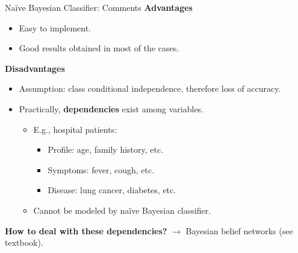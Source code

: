 \begin{frame}{Naïve Bayesian Classifier: Comments}
  \textbf{Advantages}
  \begin{itemize}
  \item Easy to implement.
  \item Good results obtained in most of the cases.
  \end{itemize}

  \textbf{Disadvantages}
  \begin{itemize}
  \item Assumption: class conditional independence, therefore loss of accuracy.
  \item Practically, \textbf{dependencies} exist among variables.
    \begin{itemize}
    \item E.g., hospital patients:
      \begin{itemize}
      \item Profile: age, family history, etc.
      \item Symptoms: fever, cough, etc.
      \item Disease: lung cancer, diabetes, etc.
      \end{itemize}
    \item Cannot be modeled by naïve Bayesian classifier.
    \end{itemize}
  \end{itemize}

  \textbf{How to deal with these dependencies?} $\rightarrow$ Bayesian belief networks (see textbook).
\end{frame}
